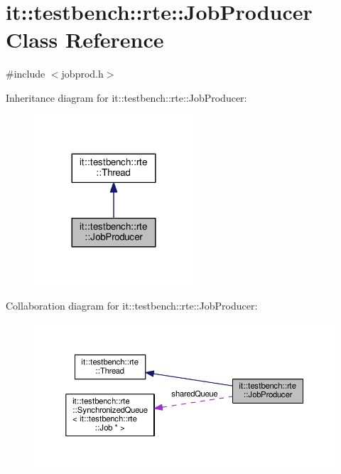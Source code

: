 \hypertarget{classit_1_1testbench_1_1rte_1_1JobProducer}{\section{it\-:\-:testbench\-:\-:rte\-:\-:Job\-Producer Class Reference}
\label{de/d4e/classit_1_1testbench_1_1rte_1_1JobProducer}
}


{\ttfamily \#include $<$jobprod.\-h$>$}



Inheritance diagram for it\-:\-:testbench\-:\-:rte\-:\-:Job\-Producer\-:
\nopagebreak
\begin{figure}[H]
\begin{center}
\leavevmode
\includegraphics[width=168pt]{d8/d56/classit_1_1testbench_1_1rte_1_1JobProducer__inherit__graph}
\end{center}
\end{figure}


Collaboration diagram for it\-:\-:testbench\-:\-:rte\-:\-:Job\-Producer\-:
\nopagebreak
\begin{figure}[H]
\begin{center}
\leavevmode
\includegraphics[width=350pt]{d1/dfc/classit_1_1testbench_1_1rte_1_1JobProducer__coll__graph}
\end{center}
\end{figure}
